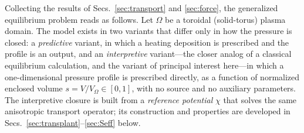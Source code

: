 \documentclass[english]{article}
\begin{document}
Collecting the results of Secs.~\ref{sec:transport} and \ref{sec:force}, the generalized
equilibrium problem reads as follows. Let $\Omega$ be a toroidal (solid-torus) plasma domain. The
model exists in two variants that differ only in how the pressure is closed: a \emph{predictive}
variant, in which a heating deposition is prescribed and the profile is an output, and an
\emph{interpretive} variant---the closer analog of a classical equilibrium calculation, and the
variant of principal interest here---in which a one-dimensional pressure profile is prescribed
directly, as a function of normalized enclosed volume $s=V/V_\Omega\in[0,1]$, with no source and
no auxiliary parameters. The
interpretive closure is built from a \emph{reference potential} $\chi$ that solves the same
anisotropic transport operator; its construction and properties are developed in
Secs.~\ref{sec:transplant}--\ref{sec:Seff} below.
\end{document}
